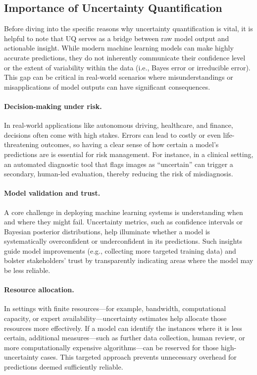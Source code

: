 \subsection{Importance of Uncertainty Quantification}
Before diving into the specific reasons why uncertainty quantification is vital, it is helpful to note that UQ serves as a bridge between raw model output and actionable insight. While modern machine learning models can make highly accurate predictions, they do not inherently communicate their confidence level or the extent of variability within the data (i.e., Bayes error or irreducible error). This gap can be critical in real-world scenarios where misunderstandings or misapplications of model outputs can have significant consequences.

\paragraph{Decision-making under risk.} In real-world applications like autonomous driving, healthcare, and finance, decisions often come with high stakes. Errors can lead to costly or even life-threatening outcomes, so having a clear sense of how certain a model’s predictions are is essential for risk management. For instance, in a clinical setting, an automated diagnostic tool that flags images as “uncertain” can trigger a secondary, human-led evaluation, thereby reducing the risk of misdiagnosis.
\paragraph{Model validation and trust.} A core challenge in deploying machine learning systems is understanding when and where they might fail. Uncertainty metrics, such as confidence intervals or Bayesian posterior distributions, help illuminate whether a model is systematically overconfident or underconfident in its predictions. Such insights guide model improvements (e.g., collecting more targeted training data) and bolster stakeholders’ trust by transparently indicating areas where the model may be less reliable.
\paragraph{Resource allocation.} In settings with finite resources---for example, bandwidth, computational capacity, or expert availability---uncertainty estimates help allocate those resources more effectively. If a model can identify the instances where it is less certain, additional measures---such as further data collection, human review, or more computationally expensive algorithms---can be reserved for those high-uncertainty cases. This targeted approach prevents unnecessary overhead for predictions deemed sufficiently reliable.
